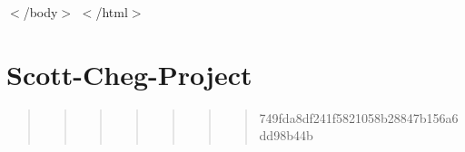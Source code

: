 $<$/body$>$ $<$/html$>$ 

 \section*{Scott-\/\+Cheg-\/\+Project}

\begin{quote}
\begin{quote}
\begin{quote}
\begin{quote}
\begin{quote}
\begin{quote}
\begin{quote}
749fda8df241f5821058b28847b156a6dd98b44b\end{quote}
\end{quote}
\end{quote}
\end{quote}
\end{quote}
\end{quote}
\end{quote}
